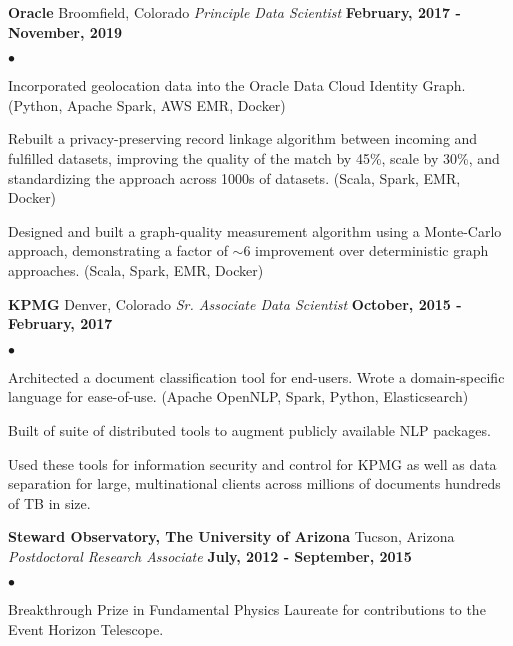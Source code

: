 \documentclass[margin,line, 11pt]{res}
\newenvironment{list2}{
  \begin{list}{$\bullet$}{%
      \setlength{\itemsep}{0in}
      \setlength{\parsep}{0in} \setlength{\parskip}{0in}
      \setlength{\topsep}{0in} \setlength{\partopsep}{0in}
      \setlength{\leftmargin}{0.2in}}}{\end{list}}
\begin{document}
\begin{resume}
\textbf{Oracle} \hfill Broomfield, Colorado\newline
\textit{Principle Data Scientist} \hfill \textbf{February, 2017 - November, 2019}\newline
    \begin{list2}
    	\vspace*{-5mm}
      \item Incorporated geolocation data into the Oracle Data Cloud Identity Graph. (Python, Apache Spark, AWS EMR, Docker)
    	\item Rebuilt a privacy-preserving record linkage algorithm between incoming and fulfilled datasets, improving the quality of the match by 45\%, scale by 30\%, and standardizing the approach across 1000s of datasets. (Scala, Spark, EMR, Docker)
    	\item Designed and built a graph-quality measurement algorithm using a Monte-Carlo approach, demonstrating a factor of $\sim 6$ improvement over deterministic graph approaches. (Scala, Spark, EMR, Docker)
    \end{list2}
\vspace*{-2mm}

\textbf{KPMG} \hfill Denver, Colorado\newline
\textit{Sr. Associate Data Scientist} \hfill \textbf{October, 2015 - February, 2017}\newline
    \begin{list2}
    	\vspace*{-5mm}
      \item Architected a document classification tool for end-users. Wrote a domain-specific language for ease-of-use. (Apache OpenNLP, Spark, Python, Elasticsearch)
      \item Built of suite of distributed tools to augment publicly available NLP packages.
      \item Used these tools for information security and control for KPMG as well as data separation for large, multinational clients across millions of documents hundreds of TB in size.
    \end{list2}
\vspace*{-2mm}

\textbf{Steward Observatory, The University of Arizona} \hfill Tucson, Arizona\newline
\textit{Postdoctoral Research Associate} \hfill \textbf{July, 2012 - September, 2015}\newline
    \begin{list2}
    	\vspace*{-5mm}
      \item Breakthrough Prize in Fundamental Physics Laureate for contributions to the Event Horizon Telescope.
    \end{list2}
\vspace*{-2mm}


\end{resume}
\end{document}
